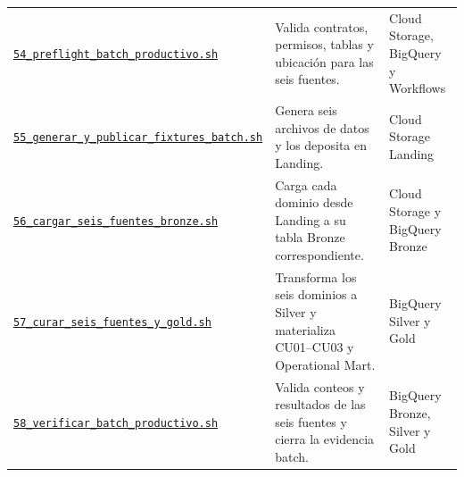 \documentclass[11pt]{article}
\begin{document}
\begin{longtable}{@{}>{\raggedright\arraybackslash}p{}>{\raggedright\arraybackslash}p{}>{\raggedright\arraybackslash}p{}@{}}
\href{https://github.com/Codenid/lumina-retail-data-platform/blob/main/implementation/automatizacion/scripts54_preflight_batch_productivo.sh}{\texttt{54\_\allowbreak{}preflight\_\allowbreak{}batch\_\allowbreak{}productivo.sh}} & Valida contratos, permisos, tablas y ubicación para las seis fuentes. & Cloud Storage, BigQuery y Workflows \\
\href{https://github.com/Codenid/lumina-retail-data-platform/blob/main/implementation/automatizacion/scripts55_generar_y_publicar_fixtures_batch.sh}{\texttt{55\_\allowbreak{}generar\_\allowbreak{}y\_\allowbreak{}publicar\_\allowbreak{}fixtures\_\allowbreak{}batch.sh}} & Genera seis archivos de datos y los deposita en Landing. & Cloud Storage Landing \\
\href{https://github.com/Codenid/lumina-retail-data-platform/blob/main/implementation/automatizacion/scripts56_cargar_seis_fuentes_bronze.sh}{\texttt{56\_\allowbreak{}cargar\_\allowbreak{}seis\_\allowbreak{}fuentes\_\allowbreak{}bronze.sh}} & Carga cada dominio desde Landing a su tabla Bronze correspondiente. & Cloud Storage y BigQuery Bronze \\
\href{https://github.com/Codenid/lumina-retail-data-platform/blob/main/implementation/automatizacion/scripts57_curar_seis_fuentes_y_gold.sh}{\texttt{57\_\allowbreak{}curar\_\allowbreak{}seis\_\allowbreak{}fuentes\_\allowbreak{}y\_\allowbreak{}gold.sh}} & Transforma los seis dominios a Silver y materializa CU01–CU03 y Operational Mart. & BigQuery Silver y Gold \\
\href{https://github.com/Codenid/lumina-retail-data-platform/blob/main/implementation/automatizacion/scripts58_verificar_batch_productivo.sh}{\texttt{58\_\allowbreak{}verificar\_\allowbreak{}batch\_\allowbreak{}productivo.sh}} & Valida conteos y resultados de las seis fuentes y cierra la evidencia batch. & BigQuery Bronze, Silver y Gold \\
\bottomrule
\end{longtable}
\endgroup
\end{document}
